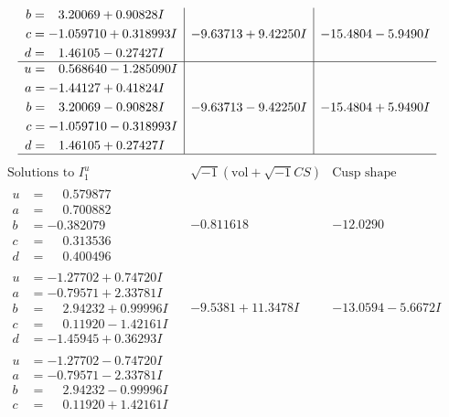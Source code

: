 \documentclass[1p]{elsarticle_modified}
\theoremstyle{definition}
\newcommand{\I}{\sqrt{-1}}
\begin{document}
$$\begin{array}{c|c|c}
\begin{aligned}
b &= \phantom{-}3.20069 + 0.90828 I \\
c &= -1.059710 + 0.318993 I \\
d &= \phantom{-}1.46105 - 0.27427 I\end{aligned}
 & -9.63713 + 9.42250 I & -15.4804 - 5.9490 I \\ \hline\begin{aligned}
u &= \phantom{-}0.568640 - 1.285090 I \\
a &= -1.44127 + 0.41824 I \\
b &= \phantom{-}3.20069 - 0.90828 I \\
c &= -1.059710 - 0.318993 I \\
d &= \phantom{-}1.46105 + 0.27427 I\end{aligned}
 & -9.63713 - 9.42250 I & -15.4804 + 5.9490 I\\
 \hline 
 \end{array}$$\newpage$$\begin{array}{c|c|c}  
\text{Solutions to }I^u_{1}& \I (\text{vol} + \sqrt{-1}CS) & \text{Cusp shape}\\
 \hline 
\begin{aligned}
u &= \phantom{-}0.579877\phantom{ +0.000000I} \\
a &= \phantom{-}0.700882\phantom{ +0.000000I} \\
b &= -0.382079\phantom{ +0.000000I} \\
c &= \phantom{-}0.313536\phantom{ +0.000000I} \\
d &= \phantom{-}0.400496\phantom{ +0.000000I}\end{aligned}
 & -0.811618\phantom{ +0.000000I} & -12.0290\phantom{ +0.000000I} \\ \hline\begin{aligned}
u &= -1.27702 + 0.74720 I \\
a &= -0.79571 + 2.33781 I \\
b &= \phantom{-}2.94232 + 0.99996 I \\
c &= \phantom{-}0.11920 - 1.42161 I \\
d &= -1.45945 + 0.36293 I\end{aligned}
 & -9.5381 + 11.3478 I & -13.0594 - 5.6672 I \\ \hline\begin{aligned}
u &= -1.27702 - 0.74720 I \\
a &= -0.79571 - 2.33781 I \\
b &= \phantom{-}2.94232 - 0.99996 I \\
c &= \phantom{-}0.11920 + 1.42161 I \\

\end{aligned}
\end{array}$$
\end{document}
